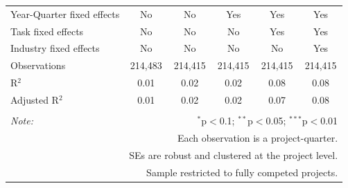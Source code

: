 \documentclass[
]{article}
\begin{document}
\begin{table}[H]
\begin{tabular}{@{\extracolsep{-2pt}}lccccc}
Year-Quarter fixed effects & No & No & Yes & Yes & Yes \\ 
Task fixed effects & No & No & No & Yes & Yes \\ 
Industry fixed effects & No & No & No & No & Yes \\ 
Observations & 214,483 & 214,415 & 214,415 & 214,415 & 214,415 \\ 
R$^{2}$ & 0.01 & 0.02 & 0.02 & 0.08 & 0.08 \\ 
Adjusted R$^{2}$ & 0.01 & 0.02 & 0.02 & 0.07 & 0.08 \\ 
\hline 
\hline \\[-1.8ex] 
\textit{Note:}  & \multicolumn{5}{r}{$^{*}$p$<$0.1; $^{**}$p$<$0.05; $^{***}$p$<$0.01} \\ 
 & \multicolumn{5}{r}{Each observation is a project-quarter.} \\ 
 & \multicolumn{5}{r}{SEs are robust and clustered at the project level.} \\ 
 & \multicolumn{5}{r}{Sample restricted to fully competed projects.} \\ 
\end{tabular} 
\end{table}
\end{document}
